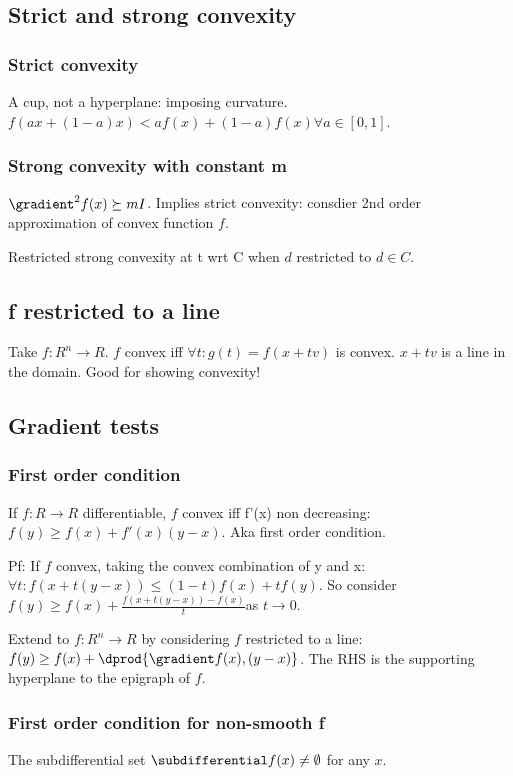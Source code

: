 \documentclass[oneside, article]{memoir}
\begin{document}
\subsection{Strict and strong convexity}
\subsubsection{Strict convexity}
A cup, not a hyperplane: imposing curvature. $f(ax + (1-a)x) < af(x) + (1-a)f(x) \forall a \in [0, 1]$.

\subsubsection{Strong convexity with constant m}
$\gradient^{2} f(x) \succeq mI$. Implies strict convexity: consdier 2nd order approximation of convex function $f$.

Restricted strong convexity at t wrt C when $d$ restricted to $d \in C$.

\subsection{f restricted to a line}
Take $f:R^{n} \to R$. $f$ convex iff $\forall t: g(t) = f(x + tv)$ is convex. $x + tv$ is a line in the domain. Good for showing convexity!

\subsection{Gradient tests}
\subsubsection{First order condition}
If $f:R \to R$ differentiable, $f$ convex iff f'(x) non decreasing: $f(y) \geq f(x) + f'(x)(y-x)$. Aka first order condition.

Pf: If $f$ convex, taking the convex combination of y and x: $\forall t: f(x + t(y-x)) \leq (1-t)f(x) + tf(y)$. So consider $f(y) \geq f(x) + \frac{f(x + t(y-x)) - f(x)}{t}$as $t\to 0$.

Extend to $f:R^{n} \to R$ by considering $f$ restricted to a line: $f(y) \geq f(x) + \dprod{\gradient f(x),(y-x)}$. The RHS is the supporting hyperplane to the epigraph of $f$.

\subsubsection{First order condition for non-smooth f}
The subdifferential set $\subdifferential f(x) \neq \emptyset$ for any $x$.
\end{document}
